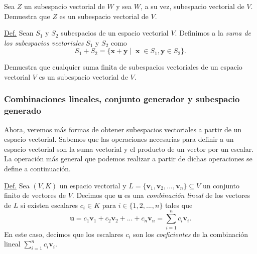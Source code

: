 \documentclass[notasLineal]{subfiles}
\begin{document}
\begin{Ejer}\label{ejer: La relación de ser subespacio vectorial es transitiva}
    Sea $Z$ un subespacio vectorial de $W$ y sea $W$, a su vez, subespacio vectorial de $V$. Demuestra que $Z$ es un subespacio vectorial de $V$.
\end{Ejer}

\begin{tcolorbox}
    \underline{Def.} Sean $S_1$ y $S_2$ subespacios de un espacio vectorial $V$. Definimos a la \emph{suma de los subespacios vectoriales} $S_1$ y $S_2$ como
    \[
    S_1+S_2=\{\mathbf{x}+\mathbf{y}\mathop|\mathop \mathbf{x}\in S_1, \mathbf{y}\in S_2\}.
    \] 
\end{tcolorbox}

\begin{Ejer}\label{ejer: La suma de subespacios vectoriales es un subespacio vectorial}
    Demuestra que cualquier suma finita de subespacios vectoriales de un espacio vectorial $V$ es un subespacio vectorial de $V$.
\end{Ejer}

\subsubsection*{Combinaciones lineales, conjunto generador y subespacio generado} \label{Sssec: Combinaciones lineales, conjunto generador y subespacio generado}

Ahora, veremos más formas de obtener subespacios vectoriales a partir de un espacio vectorial. Sabemos que las operaciones necesarias para definir a un espacio vectorial son la suma vectorial y el producto de un vector por un escalar. La operación más general que podemos realizar a partir de dichas operaciones se define a continuación.

\begin{tcolorbox}
    \underline{Def.} Sea $(V,K)$ un espacio vectorial y $L=\{\mathbf{v}_1, \mathbf{v}_2, ..., \mathbf{v}_n\}\subseteq V$ un conjunto finito de vectores de $V$. Decimos que $\mathbf{u}$ es una \emph{combinación lineal} de los vectores de $L$ si existen escalares $c_i\in K$ para $i\in\{1,2,...,n\}$ tales que
    \[
    \mathbf{u} =c_1\mathbf{v}_1+c_2\mathbf{v}_2+...+c_n\mathbf{v}_n=\sum_{i=1}^n c_i\mathbf{v}_i.
    \] 
    En este caso, decimos que los escalares $c_i$ son los \emph{coeficientes} de la combinación lineal $\sum_{i=1}^n c_i\mathbf{v}_i$.
\end{tcolorbox}
\end{document}
